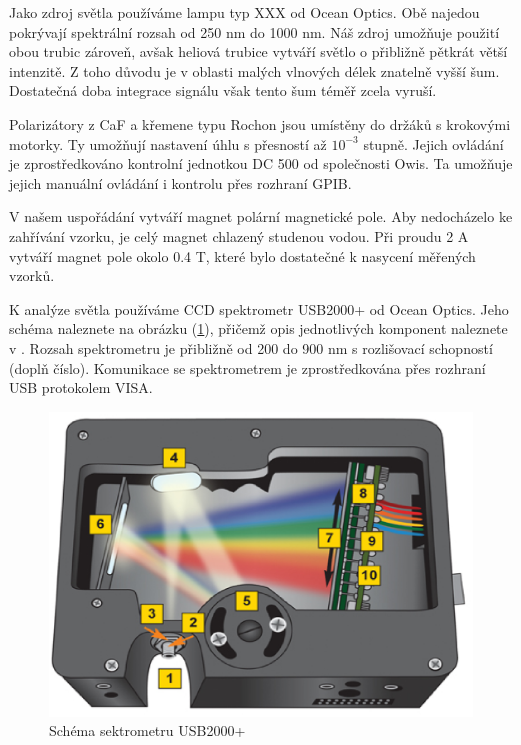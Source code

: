 Jako zdroj světla používáme lampu typ XXX od Ocean Optics. Obě najedou pokrývají spektrální rozsah od 250 nm do 1000 nm. Náš zdroj umožňuje použití obou trubic zároveň, avšak heliová trubice vytváří světlo o přibližně pětkrát větší intenzitě. Z toho důvodu je v oblasti malých vlnových délek znatelně vyšší šum. Dostatečná doba integrace signálu však tento šum téměř zcela vyruší.

Polarizátory z CaF a křemene typu Rochon jsou umístěny do držáků s krokovými motorky.  Ty umožňují nastavení úhlu s přesností až $10^{-3}$ stupně. Jejich ovládání je zprostředkováno kontrolní jednotkou DC 500 od společnosti Owis. Ta umožňuje jejich manuální ovládání i kontrolu přes rozhraní GPIB.

V našem uspořádání vytváří magnet polární magnetické pole. Aby nedocházelo ke zahřívání vzorku, je celý magnet chlazený studenou vodou. Při proudu 2 A vytváří magnet pole okolo 0.4 T, které bylo dostatečné k nasycení měřených vzorků. %

K analýze světla používáme CCD spektrometr USB2000+ od Ocean Optics. Jeho schéma naleznete na obrázku (\ref{USB2000+ schema}), přičemž opis jednotlivých komponent naleznete v \cite{USB2000}. Rozsah spektrometru je přibližně od 200 do 900 nm s rozlišovací schopností (doplň číslo). Komunikace se spektrometrem je zprostředkována přes rozhraní USB protokolem VISA. 

\begin{figure}
    \begin{center}
    \includegraphics{img/usb4openbench.eps}
    \end{center}
    \caption{Schéma sektrometru USB2000+}
    \label{USB2000+ schema}
\end{figure}

